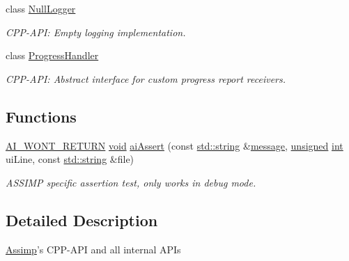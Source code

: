 \begin{DoxyCompactItemize}
class \hyperlink{class_assimp_1_1_null_logger}{Null\-Logger}
\begin{DoxyCompactList}\small\item\em C\-P\-P-\/\-A\-P\-I\-: Empty logging implementation. \end{DoxyCompactList}\item 
class \hyperlink{class_assimp_1_1_progress_handler}{Progress\-Handler}
\begin{DoxyCompactList}\small\item\em C\-P\-P-\/\-A\-P\-I\-: Abstract interface for custom progress report receivers. \end{DoxyCompactList}\end{DoxyCompactItemize}
\subsection*{Functions}
\begin{DoxyCompactItemize}
\item 
\hyperlink{ai_defines_8h_a6ce513786318507600657cebc16e2d36}{A\-I\-\_\-\-W\-O\-N\-T\-\_\-\-R\-E\-T\-U\-R\-N} \hyperlink{wglew_8h_aeea6e3dfae3acf232096f57d2d57f084}{void} \hyperlink{namespace_assimp_a7e030adcc3ee4e04a2ca937ef6fd2dec}{ai\-Assert} (const \hyperlink{glew_8h_ae84541b4f3d8e1ea24ec0f466a8c568b}{std\-::string} \&\hyperlink{glew_8h_a76333d9470ffdd4811326932394d36da}{message}, \hyperlink{_free_image_8h_a425076c7067a1b5166e2cc530e914814}{unsigned} \hyperlink{wglew_8h_a500a82aecba06f4550f6849b8099ca21}{int} ui\-Line, const \hyperlink{glew_8h_ae84541b4f3d8e1ea24ec0f466a8c568b}{std\-::string} \&file)
\begin{DoxyCompactList}\small\item\em A\-S\-S\-I\-M\-P specific assertion test, only works in debug mode. \end{DoxyCompactList}\end{DoxyCompactItemize}


\subsection{Detailed Description}
\hyperlink{namespace_assimp}{Assimp}'s C\-P\-P-\/\-A\-P\-I and all internal A\-P\-Is 

